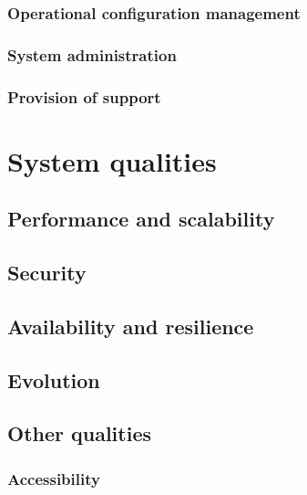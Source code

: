 \documentclass[a4paper,11pt]{report}
\begin{document}
\subsection{Operational configuration management}
\label{sec:oper-conf-manag}


\subsection{System administration}
\label{sec:syst-admin}


\subsection{Provision of support}
\label{sec:provision-support}


\chapter{System qualities}
\label{cha:system-qualities}
\thispagestyle{fancy}


\section{Performance and scalability}
\label{sec:perf-scal}


\section{Security}
\label{sec:security}



\section{Availability and resilience}
\label{sec:avail-resil}



\section{Evolution}
\label{sec:evolution}


\section{Other qualities}
\label{sec:other-qualities}

\subsection{Accessibility}
\label{sec:accessibility}
\end{document}

